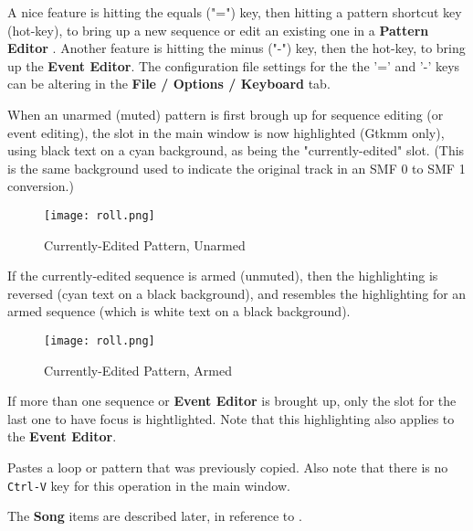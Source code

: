    A nice feature is hitting the equals ("=") key, then hitting
   a pattern shortcut key (hot-key), to bring up a new sequence or edit an
   existing one in a 
   \textbf{Pattern Editor} .  Another feature is hitting the minus
   ("-") key, then the hot-key, to bring up the \textbf{Event Editor}.
   The configuration file settings for the the '=' and
   '-' keys can be altering in the \textbf{File / Options / Keyboard} tab.

   When an unarmed (muted) pattern is first brough up for sequence editing (or
   event editing), the slot in the main window is now highlighted (Gtkmm only),
   using black text on a cyan background, as being the "currently-edited" slot.
   (This is the same background used to indicate the original track in an
   SMF 0 to SMF 1 conversion.)

\begin{figure}[H]
   \centering 
   \texttt{[image: roll.png]}
   \caption{Currently-Edited Pattern, Unarmed}
   \label{fig:pattern_window_current_seq_unarmed}
\end{figure}

   If the currently-edited sequence is armed (unmuted), then the highlighting
   is reversed (cyan text on a black background), and resembles the
   highlighting for an armed sequence (which is white text on a black
   background).

\begin{figure}[H]
   \centering 
   \texttt{[image: roll.png]}
   \caption{Currently-Edited Pattern, Armed}
   \label{fig:pattern_window_current_seq_armed}
\end{figure}

   If more than one sequence or \textbf{Event Editor}
   is brought up, only the slot for
   the last one to have focus is hightlighted.
   Note that this highlighting also applies to the \textbf{Event Editor}.

   Pastes a loop or pattern that was previously copied.
   Also note that there is no \texttt{Ctrl-V} key for this operation in the
   main window.

   The \textbf{Song} items are described later, in reference to
   .
   
